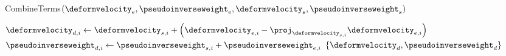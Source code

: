 \begin{algorithm}[t]
    \caption{CombineTerms$(\deformvelocity_e, \pseudoinverseweight_e, \deformvelocity_s, \pseudoinverseweight_s)$}
    \begin{algorithmic}[1]
            \State $\deformvelocity_{d,i} \gets \deformvelocity_{s,i} + \left( \deformvelocity_{e,i} - \proj_{\deformvelocity_{s,i}} \deformvelocity_{e,i} \right)$
            \State $\pseudoinverseweight_{d,i} \gets \pseudoinverseweight_{s,i} + \pseudoinverseweight_{e,i}$
        \EndFor
        \State \Return $\{ \deformvelocity_d, \pseudoinverseweight_d \}$
    \end{algorithmic}
    \label{alg:combine_terms}
\end{algorithm}